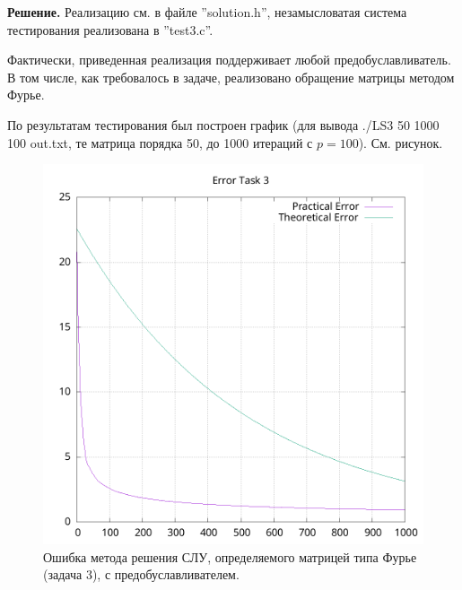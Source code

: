 \documentclass[14pt,a4paper]{extarticle}
\newcommand{\1}{\mathbbm{1}}
\begin{document}
\textbf{Решение.} 
Реализацию см. в файле ''solution.h'', незамысловатая система тестирования реализована в ''test3.c''. \par
Фактически, приведенная реализация поддерживает любой предобуславливатель. В том числе, как требовалось в задаче, 
реализовано обращение матрицы методом Фурье. \par
По результатам тестирования был построен график (для вывода ./LS3 50 1000 100 out.txt, те матрица порядка 50, до 1000 итераций 
с $p = 100$). См. рисунок.

\begin{figure}
    \centering
    \includegraphics[scale=0.55]{Error3.png}
    \caption{Ошибка метода решения СЛУ, определяемого матрицей типа Фурье (задача 3), с предобуславливателем.}
\end{figure}
\end{document}
